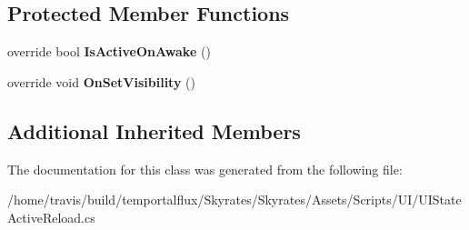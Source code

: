 \subsection*{Protected Member Functions}
\begin{DoxyCompactItemize}
\item 
\hypertarget{class_skyrates_1_1_u_i_1_1_u_i_state_active_reload_abe34532670247385e4f5c9cd1d68239a}{override bool {\bfseries Is\-Active\-On\-Awake} ()}\label{class_skyrates_1_1_u_i_1_1_u_i_state_active_reload_abe34532670247385e4f5c9cd1d68239a}

\item 
\hypertarget{class_skyrates_1_1_u_i_1_1_u_i_state_active_reload_a4f48d85e5422563c6d9d618cc5f3d0c6}{override void {\bfseries On\-Set\-Visibility} ()}\label{class_skyrates_1_1_u_i_1_1_u_i_state_active_reload_a4f48d85e5422563c6d9d618cc5f3d0c6}

\end{DoxyCompactItemize}
\subsection*{Additional Inherited Members}


The documentation for this class was generated from the following file\-:\begin{DoxyCompactItemize}
\item 
/home/travis/build/temportalflux/\-Skyrates/\-Skyrates/\-Assets/\-Scripts/\-U\-I/U\-I\-State\-Active\-Reload.\-cs\end{DoxyCompactItemize}
